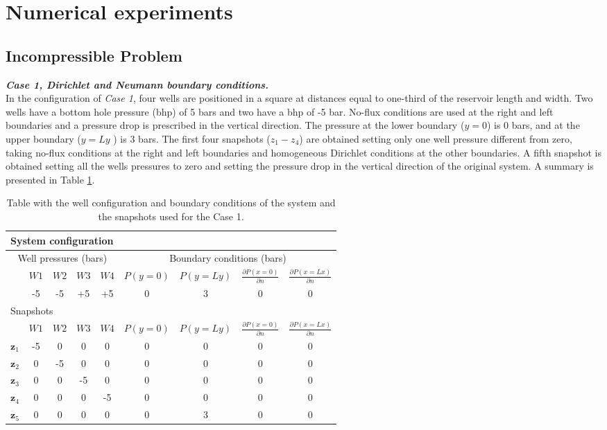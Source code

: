 \documentclass[12pt]{article}
\numberwithin{equation}{section}
\begin{document}
\newpage
\section{Numerical experiments}\label{numexp}
\subsection{Incompressible Problem}
\textbf{\emph{Case 1, Dirichlet and Neumann boundary conditions.}}\\
In the configuration of \emph{Case 1}, four wells are positioned in a square at distances equal 
to one-third of the reservoir length and width. Two wells have a bottom hole pressure (bhp) of 5 bars and two have 
a bhp of -5 bar. No-flux conditions are used at the right and left boundaries and a pressure drop
is prescribed in the vertical direction. The pressure at the lower boundary ($y=0$) is 0 bars, and at
the upper boundary ($y=Ly$ ) is 3 bars. 
The first four snapshots ($z_1-z_4$) are obtained setting only one well pressure
different from zero, taking no-flux conditions at the right and left boundaries and 
homogeneous Dirichlet conditions at the other boundaries. A fifth snapshot is obtained 
setting all the wells pressures to zero and setting the pressure drop in the vertical 
direction of the original system. 
A summary is presented in Table \ref{table:c1}.
\renewcommand{\arraystretch}{1.5}
\begin{table}[!ht]\centering
\begin{minipage}{.8\textwidth}
\vspace{-10pt}
\centering
\begin{tabular}{ |c|c|c|c|c|c|c|c|c|} 
 \hline
  \multicolumn{9}{|l|}{System configuration} \\ 
  \hline
  \multicolumn{5}{|c|}{Well pressures (bars)}&\multicolumn{4}{|c|}{Boundary conditions (bars)}\\
  \hline
  &$W1$ &$W2$ &$W3$ &$W4$ &$P(y=0)$ & $P(y=Ly)$&$\frac{\partial P(x=0)}{\partial n}$ & $\frac{\partial P(x=Lx)}{\partial n}$\\
  \hline
& -5& -5& +5& +5& 0& 3&0 &0 \\
\hline
\multicolumn{9}{|l|}{Snapshots} \\
\hline
  &$W1$ &$W2$ &$W3$ &$W4$ &$P(y=0)$ & $P(y=Ly)$&$\frac{\partial P(x=0)}{\partial n}$ & $\frac{\partial P(x=Lx)}{\partial n}$\\
  \hline
$\mathbf{z}_1$& -5&0 &0 &0 &0 &0 &0 &0 \\
$\mathbf{z}_2$& 0& -5& 0& 0& 0& 0& 0& 0\\
$\mathbf{z}_3$& 0& 0& -5& 0& 0& 0& 0& 0\\
$\mathbf{z}_4$& 0& 0& 0& -5&0 & 0& 0&0 \\
$\mathbf{z}_5$& 0& 0& 0& 0& 0& 3& 0&0 \\
 \hline
\end{tabular}
\caption{Table with the well configuration and boundary conditions of the system and the snapshots used for the Case 1.}
\label{table:c1}
\end{minipage}
\end{table}
\end{document}
